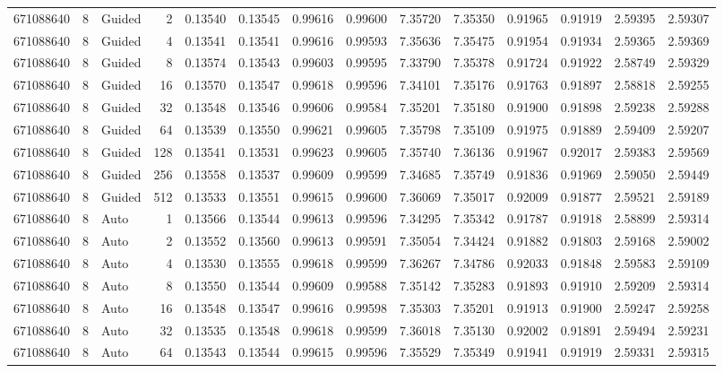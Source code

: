 \begin{tabular}{rrlrrrrrrrrrrr}
671088640 & 8 & Guided & 2 & 0.13540 & 0.13545 & 0.99616 & 0.99600 & 7.35720 & 7.35350 & 0.91965 & 0.91919 & 2.59395 & 2.59307 \\
671088640 & 8 & Guided & 4 & 0.13541 & 0.13541 & 0.99616 & 0.99593 & 7.35636 & 7.35475 & 0.91954 & 0.91934 & 2.59365 & 2.59369 \\
671088640 & 8 & Guided & 8 & 0.13574 & 0.13543 & 0.99603 & 0.99595 & 7.33790 & 7.35378 & 0.91724 & 0.91922 & 2.58749 & 2.59329 \\
671088640 & 8 & Guided & 16 & 0.13570 & 0.13547 & 0.99618 & 0.99596 & 7.34101 & 7.35176 & 0.91763 & 0.91897 & 2.58818 & 2.59255 \\
671088640 & 8 & Guided & 32 & 0.13548 & 0.13546 & 0.99606 & 0.99584 & 7.35201 & 7.35180 & 0.91900 & 0.91898 & 2.59238 & 2.59288 \\
671088640 & 8 & Guided & 64 & 0.13539 & 0.13550 & 0.99621 & 0.99605 & 7.35798 & 7.35109 & 0.91975 & 0.91889 & 2.59409 & 2.59207 \\
671088640 & 8 & Guided & 128 & 0.13541 & 0.13531 & 0.99623 & 0.99605 & 7.35740 & 7.36136 & 0.91967 & 0.92017 & 2.59383 & 2.59569 \\
671088640 & 8 & Guided & 256 & 0.13558 & 0.13537 & 0.99609 & 0.99599 & 7.34685 & 7.35749 & 0.91836 & 0.91969 & 2.59050 & 2.59449 \\
671088640 & 8 & Guided & 512 & 0.13533 & 0.13551 & 0.99615 & 0.99600 & 7.36069 & 7.35017 & 0.92009 & 0.91877 & 2.59521 & 2.59189 \\
671088640 & 8 & Auto & 1 & 0.13566 & 0.13544 & 0.99613 & 0.99596 & 7.34295 & 7.35342 & 0.91787 & 0.91918 & 2.58899 & 2.59314 \\
671088640 & 8 & Auto & 2 & 0.13552 & 0.13560 & 0.99613 & 0.99591 & 7.35054 & 7.34424 & 0.91882 & 0.91803 & 2.59168 & 2.59002 \\
671088640 & 8 & Auto & 4 & 0.13530 & 0.13555 & 0.99618 & 0.99599 & 7.36267 & 7.34786 & 0.92033 & 0.91848 & 2.59583 & 2.59109 \\
671088640 & 8 & Auto & 8 & 0.13550 & 0.13544 & 0.99609 & 0.99588 & 7.35142 & 7.35283 & 0.91893 & 0.91910 & 2.59209 & 2.59314 \\
671088640 & 8 & Auto & 16 & 0.13548 & 0.13547 & 0.99616 & 0.99598 & 7.35303 & 7.35201 & 0.91913 & 0.91900 & 2.59247 & 2.59258 \\
671088640 & 8 & Auto & 32 & 0.13535 & 0.13548 & 0.99618 & 0.99599 & 7.36018 & 7.35130 & 0.92002 & 0.91891 & 2.59494 & 2.59231 \\
671088640 & 8 & Auto & 64 & 0.13543 & 0.13544 & 0.99615 & 0.99596 & 7.35529 & 7.35349 & 0.91941 & 0.91919 & 2.59331 & 2.59315 \\

\end{tabular}
